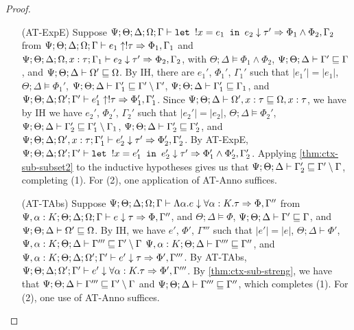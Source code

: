 \begin{proof}
\begin{itemize}
  \item[(AT-ExpE)] Suppose $\Psi ; \Theta ; \Delta ; \Omega ; \Gamma \vdash \texttt{let } !x = e_1 \texttt{ in } e_2 \downarrow \tau' \Rightarrow \Phi_1 \wedge \Phi_2, \Gamma_2$
  from $\Psi ; \Theta ; \Delta ; \Omega ; \Gamma \vdash e_1 \uparrow !\tau \Rightarrow \Phi_1,\Gamma_1$
  and $\Psi ; \Theta ; \Delta ; \Omega, x : \tau ; \Gamma_1 \vdash e_2 \downarrow \tau' \Rightarrow \Phi_2,\Gamma_2$, with
  $\Theta ; \Delta \vDash \Phi_1 \wedge \Phi_2$,
  $\Psi ; \Theta ; \Delta \vdash \Gamma' \sqsubseteq \Gamma$, and
  $\Psi ; \Theta ; \Delta \vdash \Omega' \sqsubseteq \Omega$.
  By IH, there are $e_1'$, $\Phi_1'$, $\Gamma_1'$ such that
  $|e_1'| = |e_1|$,
  $\Theta ; \Delta \vDash \Phi_1'$,
  $\Psi ; \Theta ; \Delta \vdash \Gamma_1' \sqsubseteq \Gamma' \setminus \Gamma'$,
  $\Psi ; \Theta ; \Delta \vdash \Gamma_1' \sqsubseteq \Gamma_1$, and  
  $\Psi ; \Theta ; \Delta ; \Omega' ; \Gamma' \vdash e_1' \uparrow !\tau \Rightarrow \Phi_1',\Gamma_1'$.
  Since $\Psi ; \Theta ; \Delta \vdash \Omega', x : \tau \sqsubseteq \Omega, x : \tau$, we have
  by IH we have $e_2'$, $\Phi_2'$, $\Gamma_2'$ such that
  $|e_2'| = |e_2|$,
  $\Theta ; \Delta \vDash \Phi_2'$,
  $\Psi ; \Theta ; \Delta \vdash \Gamma_2' \sqsubseteq \Gamma_1' \setminus \Gamma_1$,
  $\Psi ; \Theta ; \Delta \vdash \Gamma_2' \sqsubseteq \Gamma_2'$, and
  $\Psi ; \Theta ; \Delta ; \Omega', x : \tau ; \Gamma_1' \vdash e_2' \downarrow \tau' \Rightarrow \Phi_2',\Gamma_2'$.
  By AT-ExpE,
  $\Psi ; \Theta ; \Delta ; \Omega' ; \Gamma' \vdash \texttt{let } !x = e_1' \texttt{ in } e_2' \downarrow \tau' \Rightarrow \Phi_1' \wedge \Phi_2', \Gamma_2'$.
  Applying \autoref{thm:ctx-sub-subset2} to the inductive hypotheses gives us that
  $\Psi ; \Theta ; \Delta \vdash \Gamma_2' \sqsubseteq \Gamma' \setminus \Gamma$, completing (1).
  For (2), one application of AT-Anno suffices.
  
  \item[(AT-TAbs)] Suppose $\Psi ; \Theta ; \Delta ; \Omega ; \Gamma \vdash \Lambda \alpha. e \downarrow \forall \alpha : K.\tau \Rightarrow \Phi,\Gamma''$ from
  $\Psi, \alpha : K ; \Theta ; \Delta ; \Omega ; \Gamma \vdash e \downarrow \tau \Rightarrow \Phi, \Gamma''$, and
  $\Theta ; \Delta \vDash \Phi$,
  $\Psi ; \Theta ; \Delta \vdash \Gamma' \sqsubseteq \Gamma$, and
  $\Psi ; \Theta ; \Delta \vdash \Omega' \sqsubseteq \Omega$.
  By IH, we have $e'$, $\Phi'$, $\Gamma'''$ such that
  $|e'| = |e|$,
  $\Theta ; \Delta \vdash \Phi'$,
  $\Psi, \alpha : K ; \Theta ; \Delta \vdash \Gamma''' \sqsubseteq \Gamma' \setminus \Gamma$
  $\Psi, \alpha : K ; \Theta ; \Delta \vdash \Gamma''' \sqsubseteq \Gamma''$, and
  $\Psi, \alpha : K ; \Theta ; \Delta ; \Omega' ; \Gamma' \vdash e' \downarrow \tau \Rightarrow \Phi',\Gamma'''$.
  By AT-TAbs, $\Psi ; \Theta ; \Delta ; \Omega' ; \Gamma' \vdash e' \downarrow \forall \alpha : K. \tau \Rightarrow \Phi',\Gamma'''$.
  By \autoref{thm:ctx-sub-streng}, we have that $\Psi ; \Theta ; \Delta \vdash \Gamma''' \sqsubseteq \Gamma' \setminus \Gamma$
  and $\Psi  ; \Theta ; \Delta \vdash \Gamma''' \sqsubseteq \Gamma''$, which completes (1).
  For (2), one use of AT-Anno suffices.
  

\end{itemize}
\end{proof}
